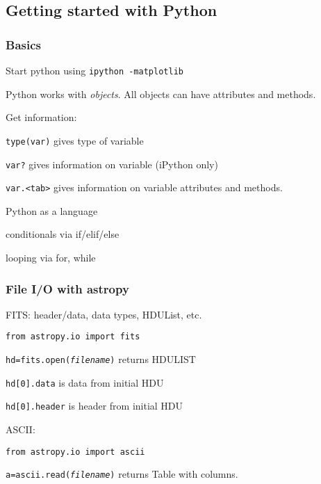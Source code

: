 \documentclass[12pt]{article}
\begin{document}
\subsection{Getting started with Python}
\subsubsection{Basics}
\begin{itemize*}
    \item Start python using \texttt{ipython -matplotlib}
    \item Python works with \emph{objects}. All objects can have
        attributes and methods.
    \item Get information:
        \begin{itemize*}
            \item \texttt{type(var)} gives type of variable
            \item \texttt{var?} gives information on variable (iPython
                only)
            \item \texttt{var.<tab>} gives information on variable
                attributes and methods.
        \end{itemize*}
    \item Python as a language
        \begin{itemize*}
            \item conditionals via if/elif/else
            \item looping via for, while
        \end{itemize*}
\end{itemize*}

\subsubsection{File I/O with astropy}
\begin{itemize*}
    \item FITS: header/data, data types, HDUList, etc.
        \begin{itemize*}
            \item \texttt{from astropy.io import fits}
            \item \texttt{hd=fits.open(\emph{filename})}
                returns HDULIST
            \item \texttt{hd[0].data} is data from initial HDU
            \item \texttt{hd[0].header} is header from initial HDU
        \end{itemize*}
    \item ASCII:
        \begin{itemize*}
            \item \texttt{from astropy.io import ascii}
            \item \texttt{a=ascii.read(\emph{filename})} returns Table with columns.
        \end{itemize*}
\end{itemize*}
\end{document}
